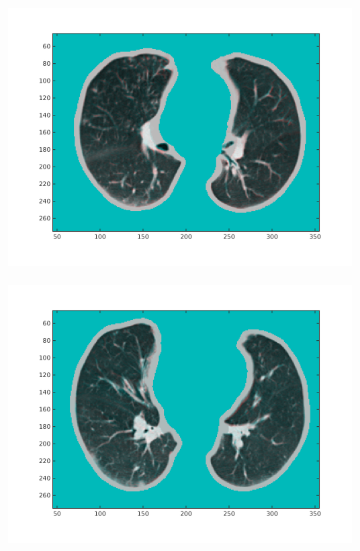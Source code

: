 \documentclass[11pt,a4paper,oneside]{report}
\begin{document}
\begin{figure}[H]
\begin{subfigure}[b]{0.3\textwidth}
	  \includegraphics[width=\textwidth, trim=20 20 20 20]{figures/reg1/reg2_5_60.png}
  \end{subfigure}
  \begin{subfigure}[b]{0.3\textwidth}
	  \includegraphics[width=\textwidth, trim=20 20 20 20]{figures/reg1/reg3_2_49.png}
  \end{subfigure}
  


\end{figure}
\end{document}

